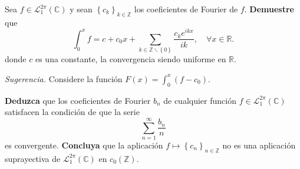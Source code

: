 \documentclass[12pt]{report}
\newcounter{it}
\theoremstyle{largebreak}
\begin{document}
    \begin{excer}
        Sea $f\in\mathcal{L}_1^{2\pi}(\mathbb{C})$ y sean $\left\{c_k \right\}_{ k\in\mathbb{Z}}$ los coeficientes de Fourier de $f$. \textbf{Demuestre} que
        \begin{equation*}
            \int_0^x f=c+c_0x+\sum_{ k\in\mathbb{Z}\backslash\left\{0\right\}}\frac{c_ke^{ ikx}}{ik},\quad\forall x\in\mathbb{R}.
        \end{equation*}
        donde $c$ es una constante, la convergencia siendo uniforme en $\mathbb{R}$.

        \textit{Sugerencia.} Considere la función $F(x)=\int_0^x (f-c_0)$.

        \textbf{Deduzca} que los coeficientes de Fourier $b_n$ de cualquier función $f\in\mathcal{L}_1^{2\pi}(\mathbb{C})$ satisfacen la condición de que la serie
        \begin{equation*}
            \sum_{ n=1}^\infty\frac{b_n}{n}
        \end{equation*}
        es convergente. \textbf{Concluya} que la aplicación $f\mapsto\left\{c_n \right\}_{ n\in\mathbb{Z}}$ no es una aplicación suprayectiva de $\mathcal{L}_1^{2\pi}(\mathbb{C})$ en $c_0(\mathbb{Z})$.
    \end{excer}
\end{document}
